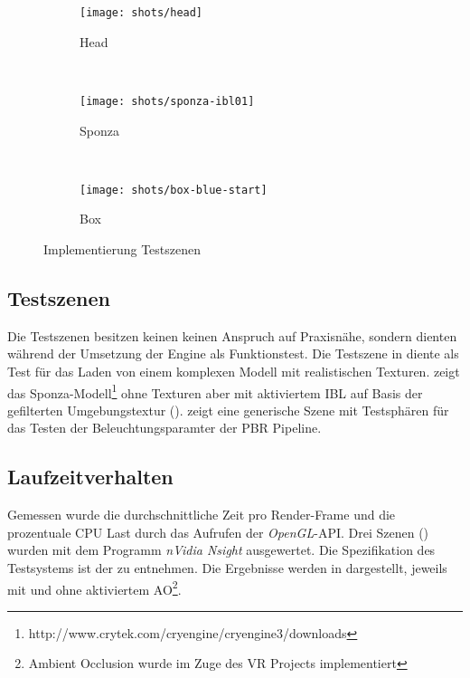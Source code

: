\begin{figure}
\begin{subfigure}{\textwidth}
	\centering
	\texttt{[image: shots/head]}
	\caption{Head}\label{fig:impl-scenes-head}
\end{subfigure}\\
\begin{subfigure}{\textwidth}
	\centering
	\texttt{[image: shots/sponza-ibl01]}
	\caption{Sponza}\label{fig:impl-scenes-sponza}
\end{subfigure}\\
\begin{subfigure}{\textwidth}
	\centering
	\texttt{[image: shots/box-blue-start]}
	\caption{Box}\label{fig:impl-scenes-box}
\end{subfigure}
\caption{Implementierung Testszenen}\label{fig:impl-scenes}
\end{figure}

\subsection{Testszenen}\label{sec:testszenen-impl}

Die Testszenen besitzen keinen keinen Anspruch auf Praxisnähe, sondern dienten während der Umsetzung der Engine als Funktionstest. Die Testszene in  diente als Test für das Laden von einem komplexen Modell mit realistischen Texturen.  zeigt das Sponza-Modell\footnote{http://www.crytek.com/cryengine/cryengine3/downloads} ohne Texturen aber mit aktiviertem \ac{IBL} auf Basis der gefilterten Umgebungstextur ().  zeigt eine generische Szene mit Testsphären für das Testen der Beleuchtungsparamter der \ac{PBR} Pipeline.

\subsection{Laufzeitverhalten}\label{sec:laufzeit-impl}

Gemessen wurde die durchschnittliche Zeit pro Render-Frame und die prozentuale CPU Last durch das Aufrufen der \textit{OpenGL}-\ac{API}. Drei Szenen () wurden mit dem Programm \textit{nVidia Nsight} ausgewertet. Die Spezifikation des Testsystems ist der  zu entnehmen. Die Ergebnisse werden in  dargestellt, jeweils mit und ohne aktiviertem \ac{AO}\footnote{Ambient Occlusion wurde im Zuge des VR Projects implementiert}.


